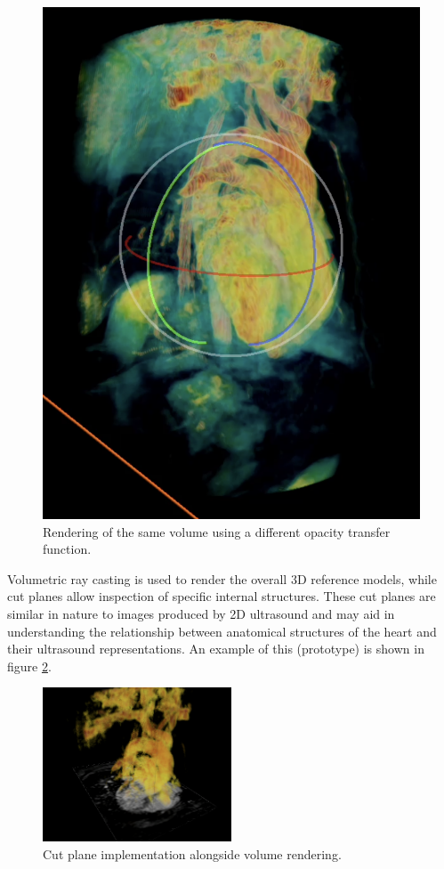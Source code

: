 \documentclass{article}
\begin{document}
\begin{figure}[tbh]
\begin{minipage}[b]{0.49\textwidth}
        \includegraphics[width=\textwidth]{images/volume2.png}
        \caption{Rendering of the same volume using a different opacity transfer function.}
        \label{fig:transferFunction2}
    \end{minipage}
\end{figure}

\newpage

Volumetric ray casting is used to render the overall 3D reference models, 
while cut planes allow inspection of specific internal structures. These cut planes are similar
in nature to images produced by 2D ultrasound and may aid in understanding the relationship 
between anatomical structures of the heart and their ultrasound representations.
An example of this (prototype) is shown in figure \ref{fig:cutPlanes}.

\begin{figure}[tbh]
    \centering
    \includegraphics[width=0.5\textwidth]{images/cutPlane.png}
    \caption{Cut plane implementation alongside volume rendering.}
    \label{fig:cutPlanes}
\end{figure}





\end{document}
